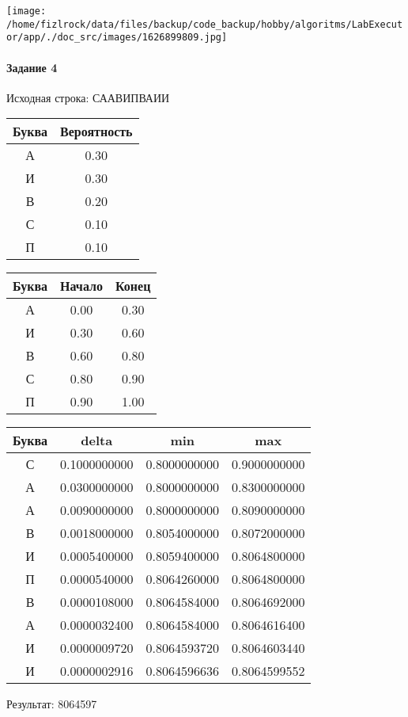 \documentclass[a4paper, 12pt]{article}
\begin{document}
\texttt{[image: /home/fizlrock/data/files/backup/code\_backup/hobby/algoritms/LabExecutor/app/./doc\_src/images/1626899809.jpg]}
\paragraph{Задание 4}


Исходная строка: СААВИПВАИИ

\begin{center}
 \begin{tabular}{ |c|c| } 
  \hline
     Буква & Вероятность \\ \hline
А & 0.30\\\hline
И & 0.30\\\hline
В & 0.20\\\hline
С & 0.10\\\hline
П & 0.10
\\ \hline \end{tabular}
\end{center}
\begin{center}
 \begin{tabular}{ |c|c|c| } 
  \hline
     Буква & Начало & Конец \\ \hline
А & 0.00 & 0.30\\\hline
И & 0.30 & 0.60\\\hline
В & 0.60 & 0.80\\\hline
С & 0.80 & 0.90\\\hline
П & 0.90 & 1.00
\\ \hline \end{tabular}
\end{center}
\begin{center}
 \begin{tabular}{ |c|c|c|c| } 
  \hline
     Буква & delta & min & max \\ \hline
С & 0.1000000000 & 0.8000000000 & 0.9000000000\\\hline
А & 0.0300000000 & 0.8000000000 & 0.8300000000\\\hline
А & 0.0090000000 & 0.8000000000 & 0.8090000000\\\hline
В & 0.0018000000 & 0.8054000000 & 0.8072000000\\\hline
И & 0.0005400000 & 0.8059400000 & 0.8064800000\\\hline
П & 0.0000540000 & 0.8064260000 & 0.8064800000\\\hline
В & 0.0000108000 & 0.8064584000 & 0.8064692000\\\hline
А & 0.0000032400 & 0.8064584000 & 0.8064616400\\\hline
И & 0.0000009720 & 0.8064593720 & 0.8064603440\\\hline
И & 0.0000002916 & 0.8064596636 & 0.8064599552
\\ \hline \end{tabular}
\end{center}
Результат: 8064597
\pagebreak
\end{document}
